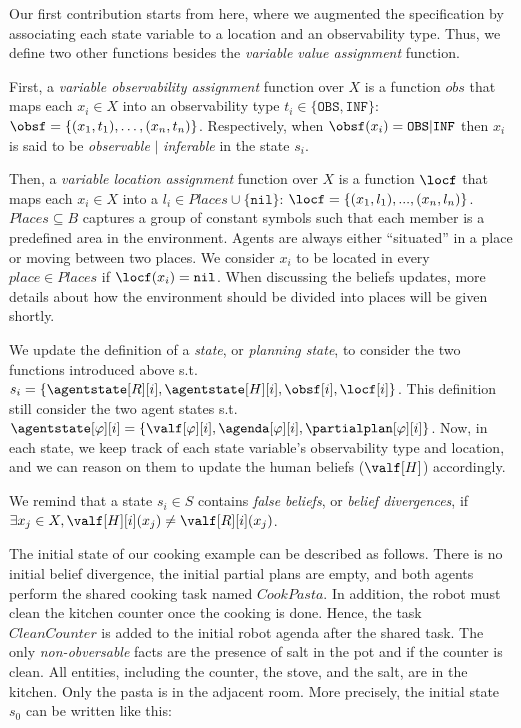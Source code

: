 Our first contribution starts from here, where we augmented the specification by associating each state variable to a location and an observability type. Thus, we define two other functions besides the \textit{variable value assignment} function.

First, a \textit{variable observability assignment} function over $X$ is a function $obs$ that maps each $x_i \in X$ into an observability type $t_i \in \{ \texttt{OBS},  \texttt{INF} \}$: $\obsf = \{ (x_1,t_1), \ldots , (x_n,t_n) \}$. Respectively, when $\obsf(x_i) = \texttt{OBS} | \texttt{INF}$ then $x_i$ is said to be \textit{observable} $|$ \textit{inferable} in the state $s_i$.

Then, a \textit{variable location assignment} function over $X$ is a function $\locf$ that maps each $x_i \in X$ into a $l_i \in Places \cup \{ \texttt{nil} \}$: $\locf = \{ (x_1,l_1), ..., (x_n,l_n) \}$. 
$Places \subseteq B$ captures a group of constant symbols such that each member is a predefined area in the environment. 
Agents are always either ``situated'' in a place or moving between two places. 
We consider $x_i$ to be located in every $place \in Places$ if $\locf(x_i)=\texttt{nil}$. 
When discussing the beliefs updates, more details about how the environment should be divided into places will be given shortly.

We update the definition of a \textit{state}, or \textit{planning state}, to consider the two functions introduced above s.t. $s_i = \{ \agentstate[R][i], \agentstate[H][i], \obsf[i], \locf[i] \}$. This definition still consider the two agent states s.t. $\agentstate[\varphi][i] = \{ \valf[\varphi][i], \agenda[\varphi][i], \partialplan[\varphi][i] \}$. Now, in each state, we keep track of each state variable's observability type and location, and we can reason on them to update the human beliefs ($\valf[H]$) accordingly. 

We remind that a state $s_i \in S$ contains \textit{false beliefs}, or \textit{belief divergences}, if $\exists x_j \in X, \valf[H][i](x_j) \neq \valf[R][i](x_j)$. 

The initial state of our cooking example can be described as follows. There is no initial belief divergence, the initial partial plans are empty, and both agents perform the shared cooking task named $CookPasta$. In addition, the robot must clean the kitchen counter once the cooking is done. Hence, the task $CleanCounter$ is added to the initial robot agenda after the shared task. The only \textit{non-obversable} facts are the presence of salt in the pot and if the counter is clean. All entities, including the counter, the stove, and the salt, are in the kitchen. Only the pasta is in the adjacent room. More precisely, the initial state $s_0$ can be written like this: 

